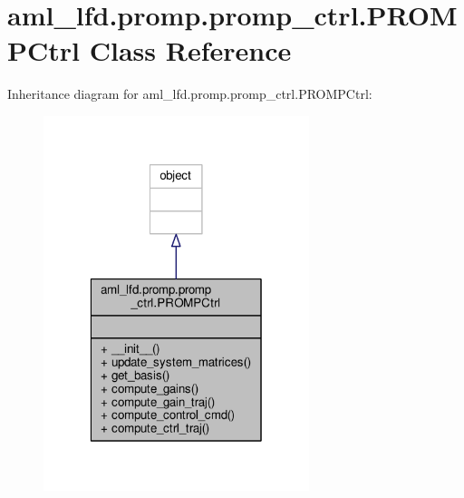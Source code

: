 \hypertarget{classaml__lfd_1_1promp_1_1promp__ctrl_1_1_p_r_o_m_p_ctrl}{\section{aml\-\_\-lfd.\-promp.\-promp\-\_\-ctrl.\-P\-R\-O\-M\-P\-Ctrl Class Reference}
\label{classaml__lfd_1_1promp_1_1promp__ctrl_1_1_p_r_o_m_p_ctrl}
}


Inheritance diagram for aml\-\_\-lfd.\-promp.\-promp\-\_\-ctrl.\-P\-R\-O\-M\-P\-Ctrl\-:
\nopagebreak
\begin{figure}[H]
\begin{center}
\leavevmode
\includegraphics[width=220pt]{classaml__lfd_1_1promp_1_1promp__ctrl_1_1_p_r_o_m_p_ctrl__inherit__graph}
\end{center}
\end{figure}


